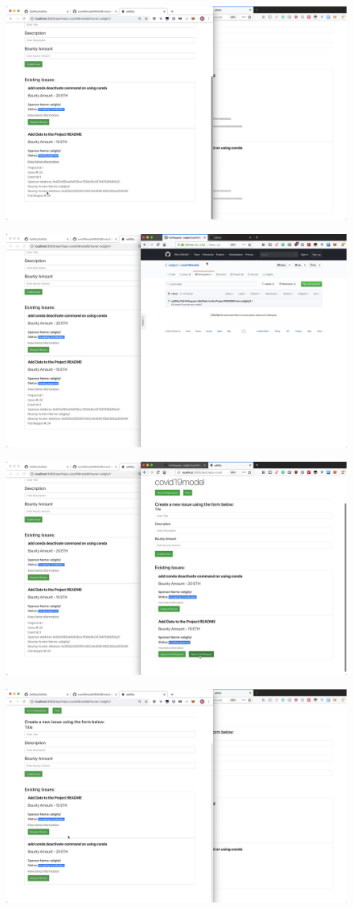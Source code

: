 \documentclass[12pt]{article}
\renewcommand{\_}{\kern-1.5pt\textunderscore\kern-1.5pt}
\begin{document}
\includegraphics[height=7cm]{graphs/36. issue_info_updated}

\includegraphics[height=7cm]{graphs/37. bob_pull_request_github}

\includegraphics[height=7cm]{graphs/38. alice_reject_pull_request}

\includegraphics[height=7cm]{graphs/39. issue_info_updated}
\end{document}
